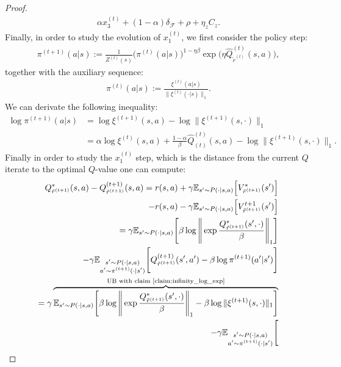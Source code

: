 \begin{proof}
\begin{equation}
\begin{aligned}
        \alpha x_3^{(t)}
        + (1-\alpha) \delta_\mathcal{F} + \rho + \eta_z C_z.
    \end{aligned}
\end{equation}
Finally, in order to study the evolution of $x_1^{(t)}$, we first consider the policy step:
\begin{align}
    \pi^{(t+1)}(a|s) := 
    \frac{1}{Z^{(t)}(s)}
    \bigl(\pi^{(t)}(a|s)\bigr)^{1-\eta \beta}
    \exp\bigl(
        \eta \hat{{Q}}_{\tilde{r}^{(t)}}^{(t)}(s,a)
    \bigr),
\end{align}
together with the auxiliary sequence:
\begin{align}
    \pi^{(t)}(a|s) := \frac{\xi^{(t)} (a|s) }{\| \xi^{(t)}(\cdot|s) \|_1}.
\end{align}
We can derivate the following inequality:
\begin{align}
    \log \pi^{(t+1)}(a|s) 
    &= \log \xi^{(t+1)}(s,a) - \log \| \xi^{(t+1)}(s,\cdot)\|_1\\
    &= \alpha \log \xi^{(t)}(s,a) 
    + \frac{1-\alpha}{\beta}\hat{Q}^{(t)}_{(t)}(s,a)  
    - \log \| \xi^{(t+1)}(s,\cdot)\|_1.
\end{align}
Finally in order to study the $x_1^{(t)}$ step, which is the distance from the current $Q$ iterate to the optimal $Q$-value one can compute:
\begin{align*}
    Q^*_{\tilde{r}^{(t+1)}}(s,a)
    -Q^{(t+1)}_{\tilde{r}^{(t+1)}}(s,a) = 
    r(s,a) + \gamma \mathbb{E}_{s'\sim P(\cdot|s,a)} \Big[ V^*_{\tilde{r}^{(t+1)}}(s')  \Big] \\
    - r(s,a) - \gamma \mathbb{E}_{s'\sim P(\cdot|s,a)} \Big[ V^{t+1}_{\tilde{r}^{(t+1)}}(s')  \Big] 
    \\
    =
    \gamma \mathbb{E}_{s'\sim P(\cdot|s,a)} \Bigg[ 
            \beta \log \Bigg\| \exp \frac{ Q^{*}_{\tilde{r}^{(t+1)}}(s',\cdot) }{\beta} \Bigg\|_1
        \Bigg] \\
    - \gamma \mathbb{E}_{\substack{s'\sim P(\cdot|s,a)\\a' \sim \pi^{(t+1)}(\cdot|s')}} \Bigg[ 
            Q^{(t+1)}_{\tilde{r}^{(t+1)}}(s',a') - \beta \log \pi^{(t+1)}(a'|s')
        \Bigg] 
    \\
    =
    \gamma \overbrace{\mathbb{E}_{s'\sim P(\cdot|s,a)} \Bigg[ 
            \beta \log \Bigg\| \exp \frac{ Q^{*}_{\tilde{r}^{(t+1)}}(s',\cdot) }{\beta} \Bigg\|_1
            - \beta \log \| \xi^{(t+1)}(s,\cdot)\|_1
        \Bigg] }^\text{UB with claim \ref{claim:infinity_log_exp}}\\
    - \gamma \mathbb{E}_{\substack{s'\sim P(\cdot|s,a)\\a' \sim \pi^{(t+1)}(\cdot|s')}} \Bigg[ 

\end{align*}
\end{proof}
